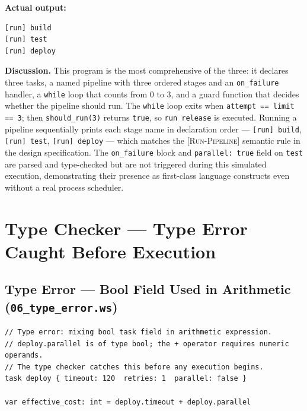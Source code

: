 \documentclass[10pt,a4paper]{article}
\begin{document}
\noindent\textbf{Actual output:}
\begin{lstlisting}[style=output]
[run] build
[run] test
[run] deploy
\end{lstlisting}

\noindent\textbf{Discussion.}
This program is the most comprehensive of the three: it declares three tasks, a named
pipeline with three ordered stages and an \texttt{on\_failure} handler, a \texttt{while}
loop that counts from 0 to 3, and a guard function that decides whether the pipeline
should run.
The \texttt{while} loop exits when \texttt{attempt == limit == 3}; then
\texttt{should\_run(3)} returns \texttt{true}, so \texttt{run release} is executed.
Running a pipeline sequentially prints each stage name in declaration order ---
\texttt{[run] build}, \texttt{[run] test}, \texttt{[run] deploy} --- which matches
the \textsc{[Run-Pipeline]} semantic rule in the design specification.
The \texttt{on\_failure} block and \texttt{parallel: true} field on \texttt{test} are
parsed and type-checked but are not triggered during this simulated execution,
demonstrating their presence as first-class language constructs even without a real
process scheduler.

\section{Type Checker --- Type Error Caught Before Execution}
\label{sec:typeerror}

\subsection{Type Error --- Bool Field Used in Arithmetic (\texttt{06\_type\_error.ws})}

\begin{lstlisting}[caption={06\_type\_error.ws --- bool task field in arithmetic expression}]
// Type error: mixing bool task field in arithmetic expression.
// deploy.parallel is of type bool; the + operator requires numeric operands.
// The type checker catches this before any execution begins.
task deploy { timeout: 120  retries: 1  parallel: false }

var effective_cost: int = deploy.timeout + deploy.parallel
\end{lstlisting}
\end{document}
